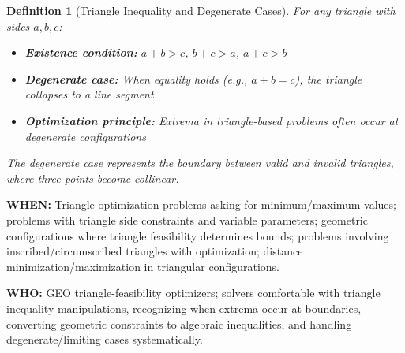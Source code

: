 \documentclass[12pt]{article}
\newtheorem{definition}{Definition}[section]
\begin{document}
\begin{definition}[Triangle Inequality and Degenerate Cases]
For any triangle with sides $a, b, c$:
\begin{itemize}
    \item \textbf{Existence condition:} $a + b > c$, $b + c > a$, $a + c > b$
    \item \textbf{Degenerate case:} When equality holds (e.g., $a + b = c$), the triangle collapses to a line segment
    \item \textbf{Optimization principle:} Extrema in triangle-based problems often occur at degenerate configurations
\end{itemize}
The degenerate case represents the boundary between valid and invalid triangles, where three points become collinear.
\end{definition}

\textbf{WHEN:} Triangle optimization problems asking for minimum/maximum values; problems with triangle side constraints and variable parameters; geometric configurations where triangle feasibility determines bounds; problems involving inscribed/circumscribed triangles with optimization; distance minimization/maximization in triangular configurations.

\textbf{WHO:} GEO triangle-feasibility optimizers; solvers comfortable with triangle inequality manipulations, recognizing when extrema occur at boundaries, converting geometric constraints to algebraic inequalities, and handling degenerate/limiting cases systematically.
\end{document}

